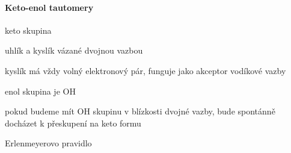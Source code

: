 \documentclass[DIV=8]{scrreprt}
\begin{document}
\paragraph{Keto-enol tautomery}
\begin{myItemize}[nosep]
    \item keto skupina
\begin{myItemize}[nosep]
    \item uhlík a kyslík vázané dvojnou vazbou
    \item kyslík má vždy volný elektronový pár, funguje jako akceptor vodíkové vazby
\end{myItemize}

    \item enol skupina je OH
    \item pokud budeme mít OH skupinu v blízkosti dvojné vazby, bude spontánně docházet k přeskupení na keto formu
\begin{myItemize}[nosep]
    \item Erlenmeyerovo pravidlo
\end{myItemize}

\end{myItemize}
\end{document}
